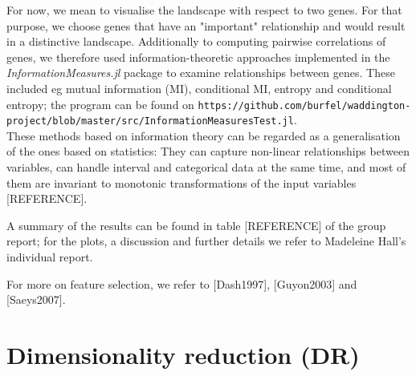 \documentclass[journal, a4paper]{IEEEtran}
\begin{document}
For now, we mean to visualise the landscape with respect to two genes. For that purpose, we choose genes that have an "important" relationship and would result in a distinctive landscape. 
Additionally to computing pairwise correlations of genes, we therefore used information-theoretic approaches implemented in the \textit{InformationMeasures.jl} package to examine relationships between genes. These included eg mutual information (MI), conditional MI,  entropy and conditional entropy; %
the program can be found on \texttt{https://github.com/burfel/waddington-project/blob/master/src/InformationMeasuresTest.jl}.\\

These methods based on information theory can be regarded as a generalisation of the ones based on statistics: They can capture non-linear relationships between variables, can handle interval and categorical data at the same time, and most of them are invariant to monotonic transformations of the input variables [REFERENCE].

A summary of the results can be found in table [REFERENCE] of the group report; for the plots, a discussion and further details we refer to Madeleine Hall's individual report.

For more on feature selection, we refer to [Dash1997], [Guyon2003] and [Saeys2007].



\section{Dimensionality reduction (DR)}

\end{document}
